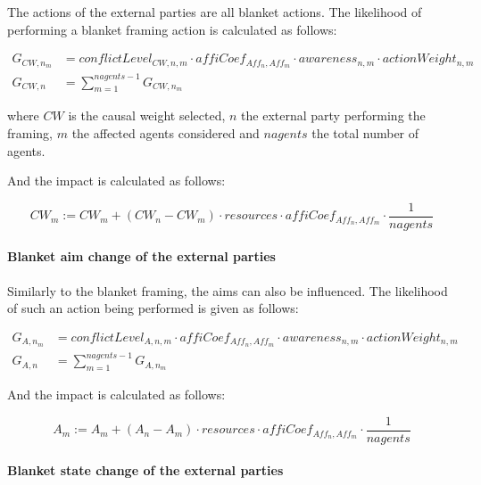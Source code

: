 The actions of the external parties are all blanket actions. The likelihood of performing a blanket framing action is calculated as follows:

\begin{equation}\label{eq:likelihoodBlanketFraming2}\begin{split}
G_{CW, n_m} &= conflictLevel_{CW, n, m} \cdot affiCoef_{Aff_n,Aff_m} \cdot awareness_{n,m} \cdot actionWeight_{n,m}\\
G_{CW, n} &= \sum_{m = 1}^{nagents-1} G_{CW, n_m}
\end{split}\end{equation}

where $CW$ is the causal weight selected, $n$ the external party performing the framing, $m$ the affected agents considered and $nagents$ the total number of agents.

And the impact is calculated as follows:

\begin{equation}\label{eq:impactBlanketFraming2}
CW_{m} := CW_{m} + \left( CW_{n} - CW_{m} \right) \cdot resources \cdot affiCoef_{Aff_n,Aff_m} \cdot \frac{1}{nagents}
\end{equation}

\paragraph{Blanket aim change of the external parties}

Similarly to the blanket framing, the aims can also be influenced. The likelihood of such an action being performed is given as follows:

\begin{equation}\label{eq:likelihoodBlanketFraming2}\begin{split}
G_{A, n_m} &= conflictLevel_{A, n, m} \cdot affiCoef_{Aff_n,Aff_m} \cdot awareness_{n,m} \cdot actionWeight_{n,m}\\
G_{A, n} &= \sum_{m = 1}^{nagents-1} G_{A, n_m}
\end{split}\end{equation}

And the impact is calculated as follows:

\begin{equation}\label{eq:impactBlanketFraming2}
A_{m} := A_{m} + \left( A_{n} - A_{m} \right) \cdot resources \cdot affiCoef_{Aff_n,Aff_m} \cdot \frac{1}{nagents}
\end{equation}

\paragraph{Blanket state change of the external parties}

